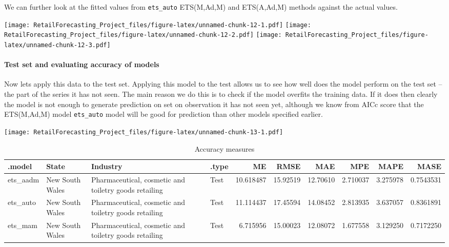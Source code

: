 \documentclass[
]{article}
\begin{document}
We can further look at the fitted values from \texttt{ets\_auto}
ETS(M,Ad,M) and ETS(A,Ad,M) methods against the actual values.

\texttt{[image: RetailForecasting\_Project\_files/figure-latex/unnamed-chunk-12-1.pdf]}
\texttt{[image: RetailForecasting\_Project\_files/figure-latex/unnamed-chunk-12-2.pdf]}
\texttt{[image: RetailForecasting\_Project\_files/figure-latex/unnamed-chunk-12-3.pdf]}

\hypertarget{test-set-and-evaluating-accuracy-of-models}{%
\paragraph{Test set and evaluating accuracy of
models}\label{test-set-and-evaluating-accuracy-of-models}}

Now lets apply this data to the test set. Applying this model to the
test allows us to see how well does the model perform on the test set --
the part of the series it has not seen. The main reason we do this is to
check if the model overfits the training data. If it does then clearly
the model is not enough to generate prediction on set on observation it
has not seen yet, although we know from AICc score that the ETS(M,Ad,M)
model \texttt{ets\_auto} model will be good for prediction than other
models specified earlier.

\texttt{[image: RetailForecasting\_Project\_files/figure-latex/unnamed-chunk-13-1.pdf]}

\begin{table}

\caption{\label{tab:unnamed-chunk-13}Accuracy measures}
\centering
\begin{tabular}[t]{l|l|l|l|r|r|r|r|r|r}
\hline
.model & State & Industry & .type & ME & RMSE & MAE & MPE & MAPE & MASE\\
\hline
ets\_aadm & New South Wales & Pharmaceutical, cosmetic and toiletry goods retailing & Test & 10.618487 & 15.92519 & 12.70610 & 2.710037 & 3.275978 & 0.7543531\\
\hline
ets\_auto & New South Wales & Pharmaceutical, cosmetic and toiletry goods retailing & Test & 11.114437 & 17.45594 & 14.08452 & 2.813935 & 3.637057 & 0.8361891\\
\hline
ets\_mam & New South Wales & Pharmaceutical, cosmetic and toiletry goods retailing & Test & 6.715956 & 15.00023 & 12.08072 & 1.677558 & 3.129250 & 0.7172250\\
\hline
\end{tabular}
\end{table}
\end{document}
